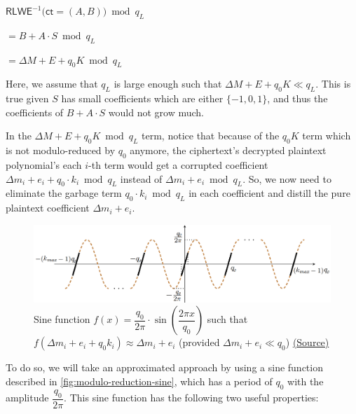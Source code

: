 $\textsf{RLWE}^{-1}\textbf{(}\textsf{ct} = (A, B)\textbf{)} \bmod q_L$

$ = B + A\cdot S \bmod q_L$

$= \Delta M + E + q_0 K \bmod q_L$

Here, we assume that $q_L$ is large enough such that $\Delta M + E + q_0K \ll q_L$. This is true given $S$ has small coefficients which are either $\{-1, 0, 1\}$, and thus the coefficients of $B + A\cdot S$ would not grow much. 


In the $\Delta M + E + q_0 K \bmod q_L$ term, notice that because of the $q_0K$ term which is not modulo-reduced by $q_0$ anymore, the ciphertext's decrypted plaintext polynomial's each $i$-th term would get a corrupted coefficient $\Delta m_i + e_i + q_0\cdot k_i \bmod q_L$ instead of $\Delta m_i + e_i \bmod q_L$. So, we now need to eliminate the garbage term $q_0\cdot k_i \bmod q_L$ in each coefficient and distill the pure plaintext coefficient $\Delta m_i + e_i$.


\begin{figure}[h!]
    \centering
  \includegraphics[width=1.0\linewidth]{figures/modulo-reduction-sine.png}
  \caption{Sine function $f(x) = \dfrac{q_0}{2\pi}\cdot \sin \left(\dfrac{2\pi x}{q_0}\right)$ such that $f(\Delta m_i + e_i + q_0k_i) \approx \Delta m_i + e_i$ (provided $\Delta m_i + e_i \ll q_0$) \href{https://eprint.iacr.org/2018/153.pdf}{(Source)}}
  \label{fig:modulo-reduction-sine}
\end{figure}

 To do so, we will take an approximated approach by using a sine function described in \autoref{fig:modulo-reduction-sine}, which has a period of $q_0$ with the amplitude $\dfrac{q_0}{2\pi}$. This sine function has the following two useful properties:
 
 